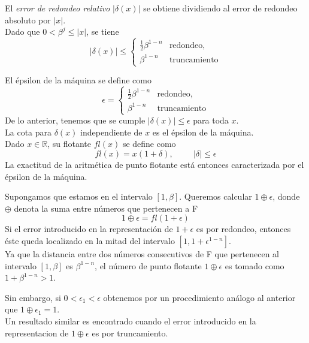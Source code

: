 \begin{frame}
El \textit{error de redondeo relativo} $\vert \delta(x) \vert$ se obtiene dividiendo al error de redondeo absoluto por $\vert x \vert$.
\\
\medskip
Dado que $0 < \beta^{j} \leq \vert x \vert$, se tiene
\[ \vert \delta (x) \vert \leq 
\begin{cases}
\frac{1}{2} \beta^{1-n} &\mbox{redondeo,} \\
\beta^{1-n} &\mbox{truncamiento}
\end{cases} \]
\end{frame}
\begin{frame}
El épsilon de la máquina se define como
\[ \epsilon = 
\begin{cases}
\frac{1}{2} \beta^{1-n} &\mbox{redondeo,} \\
\beta^{1-n} &\mbox{truncamiento}
\end{cases} \]
De lo anterior, tenemos que se cumple $\vert \delta (x) \vert \leq \epsilon$ para toda $x$.
\\
\medskip
La cota para $\delta (x)$ independiente de $x$ es el épsilon de la máquina.
\\
\medskip
Dado $x \in \mathbb{R}$, su flotante $fl(x)$ se define como
\[ fl(x) = x(1 + \delta), \hspace{1cm} \vert \delta \vert \leq \epsilon \]
La exactitud de la aritmética de punto flotante está entonces caracterizada por el épsilon de la máquina.
\end{frame}
\begin{frame}
Supongamos que estamos en el intervalo $[1, \beta]$. Queremos calcular $1 \oplus \epsilon$, donde $\oplus$ denota la suma entre números que pertenecen a F
\[ 1 \oplus \epsilon = fl(1 + \epsilon) \]
Si el error introducido en la representación de $1 + \epsilon$ es por redondeo, entonces éste
queda localizado en la mitad del intervalo $[1, 1 + \epsilon^{1-n}]$.
\\
\medskip
Ya que la distancia entre dos números consecutivos de F que pertenecen al intervalo $[1, \beta]$ es $\beta^{1-n}$, el número de punto flotante $1 \oplus \epsilon$ es tomado como $1 + \beta^{1-n} > 1$.
\end{frame}
\begin{frame}
Sin embargo, si $0 < \epsilon_{1} < \epsilon$ obtenemos por un procedimiento análogo al anterior que $1 \oplus \epsilon_{1} = 1$.
\\
\medskip
Un resultado similar es encontrado cuando el error introducido en la representacion de $1 \oplus \epsilon$ es por truncamiento.
\end{frame}

